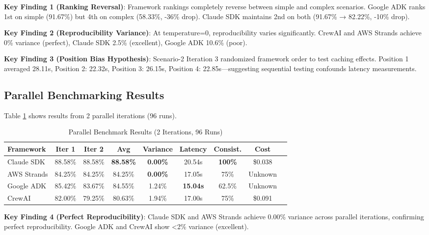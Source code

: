 \documentclass[sigconf,nonacm]{acmart}
\begin{document}
\textbf{Key Finding 1 (Ranking Reversal)}: Framework rankings completely reverse between simple and complex scenarios. Google ADK ranks 1st on simple (91.67\%) but 4th on complex (58.33\%, -36\% drop). Claude SDK maintains 2nd on both (91.67\% → 82.22\%, -10\% drop).

\textbf{Key Finding 2 (Reproducibility Variance)}: At temperature=0, reproducibility varies significantly. CrewAI and AWS Strands achieve 0\% variance (perfect), Claude SDK 2.5\% (excellent), Google ADK 10.6\% (poor).

\textbf{Key Finding 3 (Position Bias Hypothesis)}: Scenario-2 Iteration 3 randomized framework order to test caching effects. Position 1 averaged 28.11s, Position 2: 22.32s, Position 3: 26.15s, Position 4: 22.85s—suggesting sequential testing confounds latency measurements.

\subsection{Parallel Benchmarking Results}

Table \ref{tab:parallel-combined} shows results from 2 parallel iterations (96 runs).

\begin{table}[t]
\caption{Parallel Benchmark Results (2 Iterations, 96 Runs)}
\label{tab:parallel-combined}
\begin{tabular}{lcccccccc}
\toprule
\textbf{Framework} & \textbf{Iter 1} & \textbf{Iter 2} & \textbf{Avg} & \textbf{Variance} & \textbf{Latency} & \textbf{Consist.} & \textbf{Cost} \\
\midrule
Claude SDK & 88.58\% & 88.58\% & \textbf{88.58\%} & \textbf{0.00\%} & 20.54s & \textbf{100\%} & \$0.038 \\
AWS Strands & 84.25\% & 84.25\% & 84.25\% & \textbf{0.00\%} & 17.05s & 75\% & Unknown \\
Google ADK & 85.42\% & 83.67\% & 84.55\% & 1.24\% & \textbf{15.04s} & 62.5\% & Unknown \\
CrewAI & 82.00\% & 79.25\% & 80.63\% & 1.94\% & 17.00s & 75\% & \$0.091 \\
\bottomrule
\end{tabular}
\end{table}

\textbf{Key Finding 4 (Perfect Reproducibility)}: Claude SDK and AWS Strands achieve 0.00\% variance across parallel iterations, confirming perfect reproducibility. Google ADK and CrewAI show <2\% variance (excellent).
\end{document}
